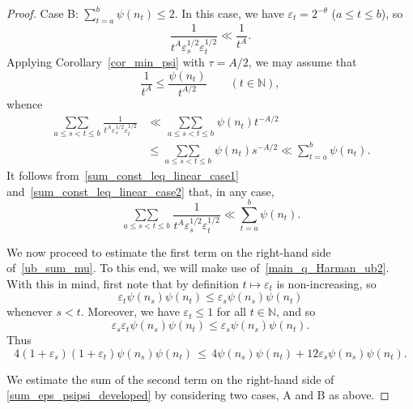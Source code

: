 \documentclass[12pt, reqno]{amsart}
\theoremstyle{definition}
\theoremstyle{remark}
\numberwithin{equation}{section}
\def\eps{\varepsilon}
\def\le{\leqslant} \def\ge{\geqslant}
\def\leq{\leqslant}
\def \bN {\mathbb N}
\begin{document}
\begin{proof}
\medskip

\noindent Case B: $\sum\limits_{t=a}^{b}\psi(n_t)\leq 2$. In this case, we have $\varepsilon_t=2^{-\theta}$ ($a\leq t\leq b$), so
\[
\frac{1}{t^{A}\varepsilon_s^{1/2}\varepsilon_t^{1/2}}\ll\frac{1}{t^{A}}.
\]
Applying Corollary~\ref{cor_min_psi} with $\tau = A/2$, we may assume that
\[
\frac{1}{t^{A}}\leq\frac{\psi(n_t)}{t^{A/2}}
\qquad (t \in \bN),
\]
whence
\begin{equation} 
\begin{aligned}
	\label{sum_const_leq_linear_case2}
	\mathop{\sum\sum}\limits_{a\leq s<t\leq b} \frac{1}{t^{A}\varepsilon_s^{1/2}
		\varepsilon_t^{1/2}} &\ll \mathop{\sum\sum}\limits_{a\leq s<t\leq b} {\psi(n_t)}{t^{-A/2}} \\ &\leq \mathop{\sum\sum}\limits_{a\leq s<t\leq b} {\psi(n_t)}{s^{-A/2}}  \ll \sum_{t=a}^b\psi(n_t).
\end{aligned}
\end{equation}
It follows from~\eqref{sum_const_leq_linear_case1} and~\eqref{sum_const_leq_linear_case2} that, in any case,
\begin{equation} \label{sum_const_leq_linear}
\mathop{\sum\sum}\limits_{a\leq s<t\leq b} \frac{1}{t^{A}\varepsilon_s^{1/2}\varepsilon_t^{1/2}}\ll \sum_{t=a}^b\psi(n_t).
\end{equation}

We now proceed to estimate the first term on the right-hand side of~\eqref{ub_sum_mu}. To this end, we will make use of~\eqref{main_q_Harman_ub2}.  With this in mind, first note that by definition $t \mapsto \eps_t$ is non-increasing, so 
\[
\eps_t \psi(n_s) \psi(n_t)
\leq
\eps_s \psi(n_s) \psi(n_t)
\]
whenever $s < t$. Moreover, we have $\eps_t \le 1$ for all $t\in\bN$, and so 
\[
\varepsilon_s
\varepsilon_t
\psi(n_s) \psi(n_t) \le \varepsilon_s
\psi(n_s)\psi(n_t).
\]
Thus
\begin{equation} \label{sum_eps_psipsi_developed}
4(1+\varepsilon_s)(1+\varepsilon_t)\psi(n_s)\psi(n_t) \, \leq \, 4\psi(n_s)\psi(n_t) + 12 \varepsilon_s \psi(n_s) \psi(n_t).
\end{equation}

We estimate the sum of the second term on the right-hand side of \eqref{sum_eps_psipsi_developed} by considering two cases, A and B as above.


\end{proof}
\end{document}
